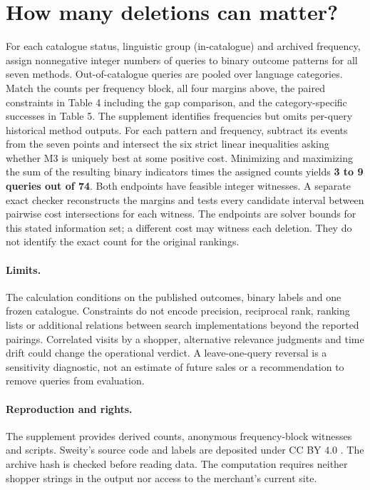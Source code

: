 \documentclass[11pt]{article}
\begin{document}
\section{How many deletions can matter?}
For each catalogue status, linguistic group (in-catalogue) and archived frequency, assign nonnegative integer numbers of queries to binary outcome patterns for all seven methods. Out-of-catalogue queries are pooled over language categories. Match the counts per frequency block, all four margins above, the paired constraints in Table 4 including the gap comparison, and the category-specific successes in Table 5. The supplement identifies frequencies but omits per-query historical method outputs.
For each pattern and frequency, subtract its events from the seven points and intersect the six strict linear inequalities asking whether M3 is uniquely best at some positive cost. Minimizing and maximizing the sum of the resulting binary indicators times the assigned counts yields \textbf{3 to 9 queries out of 74}. Both endpoints have feasible integer witnesses. A separate exact checker reconstructs the margins and tests every candidate interval between pairwise cost intersections for each witness. The endpoints are solver bounds for this stated information set; a different cost may witness each deletion. They do not identify the exact count for the original rankings.
\paragraph{Limits.} The calculation conditions on the published outcomes, binary labels and one frozen catalogue. Constraints do not encode precision, reciprocal rank, ranking lists or additional relations between search implementations beyond the reported pairings. Correlated visits by a shopper, alternative relevance judgments and time drift could change the operational verdict. A leave-one-query reversal is a sensitivity diagnostic, not an estimate of future sales or a recommendation to remove queries from evaluation.
\paragraph{Reproduction and rights.} The supplement provides derived counts, anonymous frequency-block witnesses and scripts. Sweity's source code and labels are deposited under CC BY 4.0 \cite{sweity}. The archive hash is checked before reading data. The computation requires neither shopper strings in the output nor access to the merchant's current site.
\end{document}
